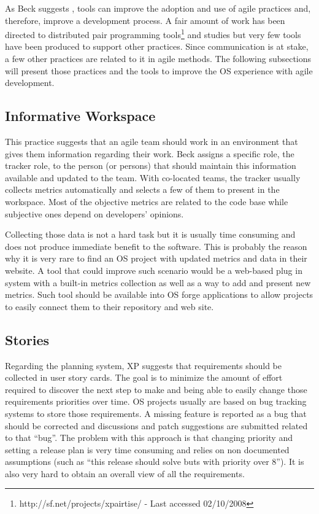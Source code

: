 As Beck suggests \cite{Beck2008}, tools can improve the adoption and
use of agile practices and, therefore, improve a development
process. A fair amount of work has been directed to distributed pair
programming tools\footnote{http://sf.net/projects/xpairtise/ - Last
  accessed 02/10/2008} and studies \cite{Nagappan2003} but very few
tools have been produced to support other practices. Since
communication is at stake, a few other practices are related to it in
agile methods. The following subsections will present those practices
and the tools to improve the OS experience with agile development.

\subsection{Informative Workspace}
\label{subsec:inform-worksp}

This practice suggests that an agile team should work in an
environment that gives them information regarding their work. Beck
assigns a specific role, the tracker role, to the person (or persons)
that should maintain this information available and updated to the
team. With co-located teams, the tracker usually collects metrics
\cite{Sato2007} automatically and selects a few of them to present in
the workspace. Most of the objective metrics are related to the code
base while subjective ones depend on developers' opinions.

Collecting those data is not a hard task but it is usually time
consuming and does not produce immediate benefit to the software.
This is probably the reason why it is very rare to find an OS project
with updated metrics and data in their website. A tool that could
improve such scenario would be a web-based plug in system with a
built-in metrics collection as well as a way to add and present new
metrics. Such tool should be available into OS forge applications to
allow projects to easily connect them to their repository and web
site.

\subsection{Stories}
\label{subsec:stories}

Regarding the planning system, XP suggests that requirements should be
collected in user story cards. The goal is to minimize the amount of
effort required to discover the next step to make and being able to
easily change those requirements priorities over time. OS projects
usually are based on bug tracking systems to store those
requirements. A missing feature is reported as a bug that should be
corrected and discussions and patch suggestions are submitted related
to that ``bug''. The problem with this approach is that changing
priority and setting a release plan is very time consuming and relies
on non documented assumptions (such as ``this release should solve
buts with priority over 8'').  It is also very hard to obtain an
overall view of all the requirements.

